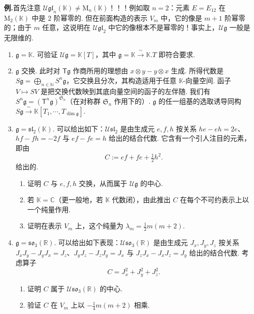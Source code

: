 \noindent\textbf{例.}\quad 首先注意 $\mathcal U\mathfrak{gl}_n(\mathbb K)\neq\mathrm M_n(\mathbb K)$！！！例如取 $n=2$：元素 $E=E_{12}$ 在 $\mathrm M_2(\mathbb K)$ 中是 $2$ 阶幂零的. 但在前面构造的表示 $V_m$ 中，它的像是 $m+1$ 阶幂零的；由于 $m$ 任意，这说明在 $\mathcal U\mathfrak{gl}_2$ 中它的像根本不是幂零的！事实上，$\mathcal U\mathfrak g$ 一般是无限维的.
\begin{enumerate}[label=\roman*)]
\item $\mathfrak g=\mathbb K$. 可验证 $\mathcal U\mathfrak g=\mathbb K[T]$，其中 $\mathfrak g=\mathbb K\xrightarrow{\ \sim\ }\mathbb K.T$ 即符合要求.
\item $\mathfrak g$ 交换. 此时对 $\mathsf T\mathfrak g$ 作商所用的理想由 $x\otimes y-y\otimes x$ 生成. 所得代数是 $S\mathfrak g=\bigoplus_{n\in\mathbb N}S^n\mathfrak g$，它交换且分次，其构造适用于任意 $\mathbb K$-向量空间. 函子 $V\mapsto SV$ 是把交换代数映到其底向量空间的函子的左伴随. 我们有 $S^n\mathfrak g=(\mathsf T^n\mathfrak g)^{\mathfrak S_n}$（在对称群 $\mathfrak S_n$ 作用下的）. $\mathfrak g$ 的任一组基的选取诱导同构 $S\mathfrak g\xrightarrow{\ \sim\ }\mathbb K[T_1,\cdots,T_{\dim\mathfrak g}]$.
\item $\mathfrak g=\mathfrak{sl}_2(\mathbb K)$. 可以给出如下：$\mathcal U\mathfrak{sl}_2$ 是由生成元 $e,f,h$ 按关系 $he-eh=2e$、$hf-fh=-2f$ 与 $ef-fe=h$ 给出的结合代数. 它含有一个引人注目的元素，即由
\[
C:=ef+fe+\tfrac12 h^2.
\]
给出的.
\begin{exercise*}
\begin{enumerate}[label=\alph*)]
\item 证明 $C$ 与 $e,f,h$ 交换，从而属于 $\mathcal U\mathfrak g$ 的中心.
\item 若 $\mathbb K=\mathbb C$（更一般地，若 $\mathbb K$ 代数闭），由此推出 $C$ 在每个不可约表示上以一个纯量作用.
\item 证明在表示 $V_m$ 上，这个纯量为 $\lambda_m=\tfrac12 m(m+2)$.
\end{enumerate}
\end{exercise*}
\item $\mathfrak g=\mathfrak{so}_3(\mathbb R)$. 可以给出如下表现：$\mathcal U\mathfrak{so}_3(\mathbb R)$ 是由生成元 $J_x,J_y,J_z$ 按关系 $J_xJ_y-J_yJ_x=J_z$、$J_yJ_z-J_zJ_y=J_x$ 与 $J_zJ_x-J_xJ_z=J_y$ 给出的结合代数. 考虑算子
\[
C=J_x^2+J_y^2+J_z^2.
\]
\begin{exercise*}
\begin{enumerate}[label=\alph*)]
\item 证明 $C$ 属于 $\mathcal U\mathfrak{so}_3(\mathbb R)$ 的中心.
\item 验证 $C$ 在 $V_m$ 上以 $-\tfrac14 m(m+2)$ 相乘.
\end{enumerate}
\end{exercise*}
\end{enumerate}

